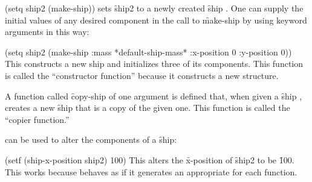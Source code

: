 \code
 (setq ship2 (make-ship))
\endcode
sets \f{ship2} to a newly created \f{ship} .
One can supply the initial values of any desired component in the call
to \f{make-ship} by using keyword arguments in this way:

\code
 (setq ship2 (make-ship :mass *default-ship-mass*
                        :x-position 0
                        :y-position 0))
\endcode
This constructs a new ship and initializes three of its components.
This function is called the ``constructor function''
because it constructs a new structure.

A function called \f{copy-ship} of one argument
is defined that, when given a \f{ship} ,
creates a new \f{ship}  that is a copy of the given one.
This function is called the ``copier function.''
\endlist

 can be used to alter the components of a \f{ship}:

\code
 (setf (ship-x-position ship2) 100)
\endcode
This alters the \f{x-position} of \f{ship2} to be \f{100}.
This works because  behaves as if
it generates an appropriate 
for each  function.



